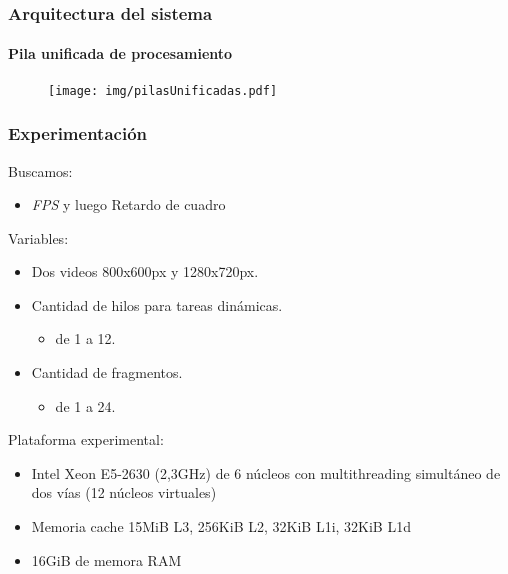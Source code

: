 \documentclass[11pt,a4paper,spanish]{beamer}
\begin{document}
\begin{frame}

\frametitle{Arquitectura del sistema}

\framesubtitle{Pila unificada de procesamiento}

\begin{figure}[h]

	\centering

	\texttt{[image: img/pilasUnificadas.pdf]}

\end{figure}

\end{frame}

\begin{frame}

\frametitle{Experimentación}

Buscamos:

\begin{itemize}

	\item \emph{FPS} y luego Retardo de cuadro

\end{itemize}

Variables:

\begin{itemize}

        \item Dos videos 800x600px y 1280x720px.

        \item Cantidad de hilos para tareas dinámicas.

	\begin{itemize}

        \item de 1 a 12.

	\end{itemize}

	\item Cantidad de fragmentos.

	\begin{itemize}

        	\item de 1 a 24.

	\end{itemize}

\end{itemize}

Plataforma experimental:

\begin{itemize}

	\item Intel Xeon E5-2630 (2,3GHz) de 6 núcleos con multithreading
		simultáneo de dos vías (12 núcleos virtuales)

	\item Memoria cache 15MiB L3, 256KiB L2, 32KiB L1i, 32KiB L1d

	\item 16GiB de memora RAM

\end{itemize}

\end{frame}
\end{document}
